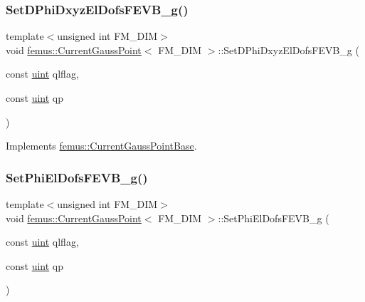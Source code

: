 \subsubsection{\texorpdfstring{Set\+D\+Phi\+Dxyz\+El\+Dofs\+F\+E\+V\+B\+\_\+g()}{SetDPhiDxyzElDofsFEVB\_g()}}
{\footnotesize\ttfamily template$<$unsigned int F\+M\+\_\+\+D\+IM$>$ \\
void \mbox{\hyperlink{classfemus_1_1_current_gauss_point}{femus\+::\+Current\+Gauss\+Point}}$<$ F\+M\+\_\+\+D\+IM $>$\+::Set\+D\+Phi\+Dxyz\+El\+Dofs\+F\+E\+V\+B\+\_\+g (\begin{DoxyParamCaption}\item[{const \mbox{\hyperlink{_typedefs_8hpp_a91ad9478d81a7aaf2593e8d9c3d06a14}{uint}}}]{qlflag,  }\item[{const \mbox{\hyperlink{_typedefs_8hpp_a91ad9478d81a7aaf2593e8d9c3d06a14}{uint}}}]{qp }\end{DoxyParamCaption})\hspace{0.3cm}{\ttfamily [virtual]}}



Implements \mbox{\hyperlink{classfemus_1_1_current_gauss_point_base_a119838d470a6e444ef0b54220b5dc3bc}{femus\+::\+Current\+Gauss\+Point\+Base}}.

\mbox{\label{classfemus_1_1_current_gauss_point_a7a11e1164802fdc683726eea6123d99f}} 
\subsubsection{\texorpdfstring{Set\+Phi\+El\+Dofs\+F\+E\+V\+B\+\_\+g()}{SetPhiElDofsFEVB\_g()}}
{\footnotesize\ttfamily template$<$unsigned int F\+M\+\_\+\+D\+IM$>$ \\
void \mbox{\hyperlink{classfemus_1_1_current_gauss_point}{femus\+::\+Current\+Gauss\+Point}}$<$ F\+M\+\_\+\+D\+IM $>$\+::Set\+Phi\+El\+Dofs\+F\+E\+V\+B\+\_\+g (\begin{DoxyParamCaption}\item[{const \mbox{\hyperlink{_typedefs_8hpp_a91ad9478d81a7aaf2593e8d9c3d06a14}{uint}}}]{qlflag,  }\item[{const \mbox{\hyperlink{_typedefs_8hpp_a91ad9478d81a7aaf2593e8d9c3d06a14}{uint}}}]{qp }\end{DoxyParamCaption})\hspace{0.3cm}{\ttfamily [virtual]}}



